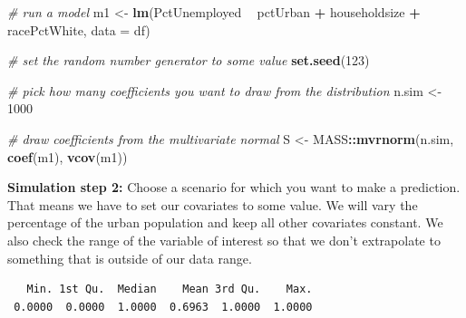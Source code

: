 \documentclass[]{article}
\newenvironment{Shaded}{\begin{snugshade}}{\end{snugshade}}
\newcommand{\CommentTok}[1]{\textcolor[rgb]{0.56,0.35,0.01}{\textit{#1}}}
\newcommand{\DataTypeTok}[1]{\textcolor[rgb]{0.13,0.29,0.53}{#1}}
\newcommand{\DecValTok}[1]{\textcolor[rgb]{0.00,0.00,0.81}{#1}}
\newcommand{\FloatTok}[1]{\textcolor[rgb]{0.00,0.00,0.81}{#1}}
\newcommand{\KeywordTok}[1]{\textcolor[rgb]{0.13,0.29,0.53}{\textbf{#1}}}
\newcommand{\NormalTok}[1]{#1}
\newcommand{\OperatorTok}[1]{\textcolor[rgb]{0.81,0.36,0.00}{\textbf{#1}}}
\newcommand{\StringTok}[1]{\textcolor[rgb]{0.31,0.60,0.02}{#1}}
\begin{document}
\begin{Shaded}
\begin{Highlighting}[]
\CommentTok{# run a model}
\NormalTok{m1 <-}\StringTok{ }\KeywordTok{lm}\NormalTok{(PctUnemployed }\OperatorTok{~}\StringTok{ }\NormalTok{pctUrban }\OperatorTok{+}\StringTok{ }\NormalTok{householdsize }\OperatorTok{+}\StringTok{ }\NormalTok{racePctWhite, }\DataTypeTok{data =}\NormalTok{ df)}

\CommentTok{# set the random number generator to some value}
\KeywordTok{set.seed}\NormalTok{(}\DecValTok{123}\NormalTok{)}

\CommentTok{# pick how many coefficients you want to draw from the distribution}
\NormalTok{n.sim <-}\StringTok{ }\DecValTok{1000}

\CommentTok{# draw coefficients from the multivariate normal}
\NormalTok{S <-}\StringTok{ }\NormalTok{MASS}\OperatorTok{::}\KeywordTok{mvrnorm}\NormalTok{(n.sim, }\KeywordTok{coef}\NormalTok{(m1), }\KeywordTok{vcov}\NormalTok{(m1))}
\end{Highlighting}
\end{Shaded}

\textbf{Simulation step 2:} Choose a scenario for which you want to make a prediction. That means we have to set our covariates to some value. We will vary the percentage of the urban population and keep all other covariates constant. We also check the range of the variable of interest so that we don't extrapolate to something that is outside of our data range.

\begin{Shaded}
\end{Shaded}

\begin{verbatim}
   Min. 1st Qu.  Median    Mean 3rd Qu.    Max. 
 0.0000  0.0000  1.0000  0.6963  1.0000  1.0000 
\end{verbatim}

\begin{Shaded}
\end{Shaded}
\end{document}
